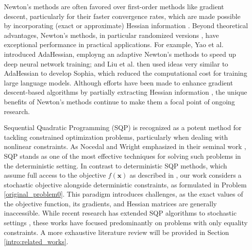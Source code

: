 \documentclass[aos]{imsart}
\numberwithin{equation}{section}
\theoremstyle{plain}
\begin{document}
Newton's methods are often favored over first-order methods like gradient descent, particularly for their faster convergence rates, which are made possible by incorporating (exact or approximate) Hessian information \cite{jorge2006numerical, na2022hessian, yue2019quadratic}.
Beyond theoretical advantages, Newton's methods, in particular randomized versions \cite{fred_SSN_JRNL,XRM17_theory_TR,XRM17_empirical_TR,YXRM18_TR}, have exceptional performance in practical applications. 
For example, Yao et al. \cite{yao2021adahessian} introduced AdaHessian, employng an adaptive Newton's methods to speed up deep neural network training; and 
Liu et al. \cite{liu2023sophia} then used ideas very similar to AdaHessian to develop Sophia, which reduced the computational cost for training large language models. 
Although efforts have been made to enhance gradient descent-based algorithms by partially extracting Hessian information \cite{carmon2017convex, carmon2018accelerated, allen2018make}, the unique benefits of Newton's methods continue to make them a focal point of ongoing research.


Sequential Quadratic Programming (SQP) is recognized as a potent method for tackling constrained optimization problems, particularly when dealing with nonlinear constraints. As Nocedal and Wright emphasized in their seminal work \cite{jorge2006numerical}, SQP stands as one of the most effective techniques for solving such problems in the deterministic setting.
In contrast to deterministic SQP methods, which assume full access to the objective $f(\bm{x})$ as described in \cite{boggs1995sequential, jorge2006numerical}, our work considers a stochastic objective alongside deterministic constraints, as formulated in Problem \eqref{original_problem0}.
This paradigm introduces challenges, as the exact values of the objective function, its gradients, and Hessian matrices are generally inaccessible.
While recent research has extended SQP algorithms to stochastic settings \cite{na2022asymptotic, na2023inequality, fang2022fully, na2023adaptive, curtis2023worst, curtis2023sequential, curtis2021inexact, berahas2021stochastic, duchi2021asymptotic}, these works have focused predominantly on problems with only equality constraints. 
A more exhaustive literature review will be provided in Section \ref{intro:related_works}.
\end{document}
